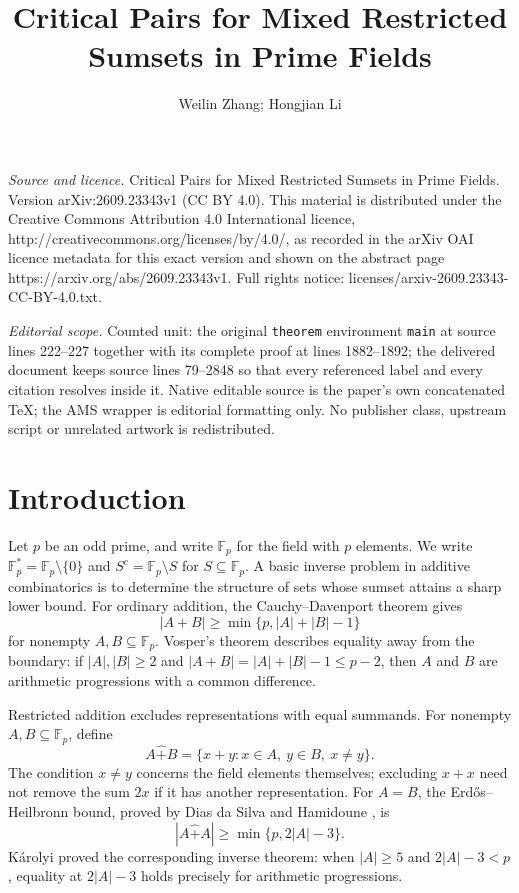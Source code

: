\documentclass[10pt,a4paper]{amsart}
\newcommand{\F}{\mathbb{F}_p}
\newcommand{\rs}{\mathbin{\widehat+}}
\begin{document}
\title[Critical Pairs for Mixed Restricted Sumsets in Prime Fields]{Critical Pairs for Mixed Restricted Sumsets in Prime Fields}
\author{Weilin Zhang; Hongjian Li}
\date{}
\maketitle
\noindent\emph{Source and licence.} Critical Pairs for Mixed Restricted Sumsets in Prime Fields. Version arXiv:2609.23343v1 (CC BY 4.0). This material is distributed under the Creative Commons Attribution 4.0 International licence, http://creativecommons.org/licenses/by/4.0/, as recorded in the arXiv OAI licence metadata for this exact version and shown on the abstract page https://arxiv.org/abs/2609.23343v1. Full rights notice: licenses/arxiv-2609.23343-CC-BY-4.0.txt.\par\smallskip
\noindent\textit{Editorial scope.} Counted unit: the original \texttt{theorem} environment \texttt{main} at source lines 222--227 together with its complete proof at lines 1882--1892; the delivered document keeps source lines 79--2848 so that every referenced label and every citation resolves inside it. Native editable source is the paper's own concatenated TeX; the AMS wrapper is editorial formatting only. No publisher class, upstream script or unrelated artwork is redistributed.
\section{Introduction}\label{intro}

Let $p$ be an odd prime, and write $\F$ for the field with $p$ elements.
We write $\F^*=\F\setminus\{0\}$ and
$S^c=\F\setminus S$ for $S\subseteq\F$.
A basic inverse problem in additive combinatorics is to determine the
structure of sets whose sumset attains a sharp lower bound.  For ordinary
addition, the Cauchy--Davenport theorem \cite{Cauchy,Davenport} gives
\[
 |A+B|\ge\min\{p,|A|+|B|-1\}
\]
for nonempty $A,B\subseteq\F$.  Vosper's theorem
\cite{Vosper1,Vosper2} describes equality away from the boundary: if
$|A|,|B|\ge2$ and $|A+B|=|A|+|B|-1\le p-2$, then $A$ and $B$ are
arithmetic progressions with a common difference.

Restricted addition excludes representations with equal summands.  For
nonempty $A,B\subseteq\F$, define
\[
 A\rs B=\{x+y:x\in A,\ y\in B,\ x\ne y\}.
\]
The condition $x\ne y$ concerns the field elements themselves; excluding
$x+x$ need not remove the sum $2x$ if it has another representation.
For $A=B$, the Erd\H{o}s--Heilbronn bound, proved by Dias da Silva and
Hamidoune \cite{DH}, is
\[
 |A\rs A|\ge\min\{p,2|A|-3\}.
\]
K\'arolyi \cite[Theorem 7]{Karolyi} proved the corresponding inverse theorem: when
$|A|\ge5$ and $2|A|-3<p$, equality at $2|A|-3$ holds precisely for
arithmetic progressions.
\end{document}
